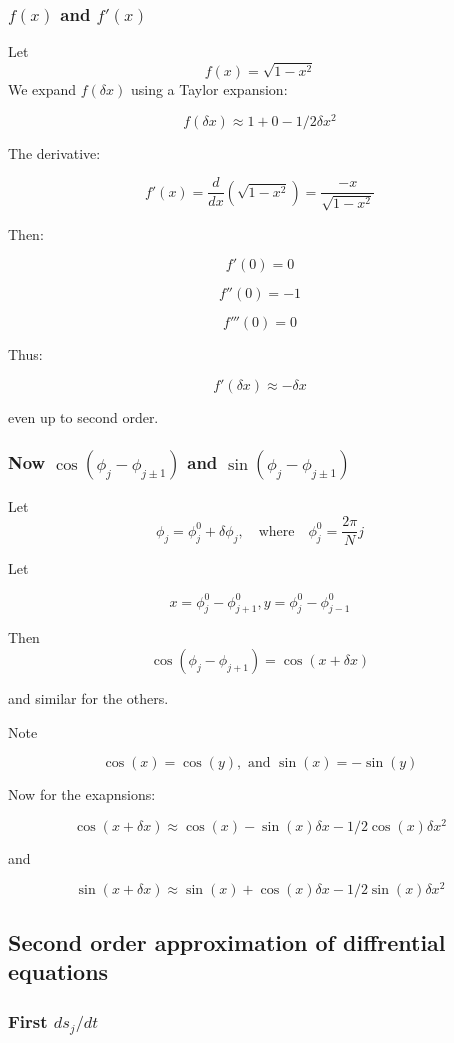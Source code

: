 \documentclass{article}
\begin{document}
\subsubsection{$f(x)$ and $f'(x)$}
Let 
\[
f(x) = \sqrt{1 - x^2}
\]
We expand \( f(\delta x) \) using a Taylor expansion:

\[
\boxed{f(\delta x) \approx 1 + 0 - 1/2 \delta x^2}
\]

The derivative:

\[
f'(x) = \frac{d}{dx} \left( \sqrt{1 - x^2} \right) = \frac{-x}{\sqrt{1 - x^2}}
\]

Then:

\[
f'(0) = 0
\]

\[
f''(0) = -1
\]

\[
f'''(0) = 0
\]

Thus:

\[
\boxed{f'(\delta x) \approx -\delta x}
\]

even up to second order.

\subsubsection{Now $\cos(\phi_j - \phi_{j\pm1})$ and $\sin(\phi_j - \phi_{j\pm1})$}

Let
\[
\phi_j = \phi_j^0 + \delta \phi_j, \quad \text{where} \quad \phi_j^0 = \frac{2\pi}{N} j
\]

Let 

\[
x = \phi_j^0 - \phi_{j+1}^0, y = \phi_j^0 - \phi_{j-1}^0
\]

Then 
\[
    \cos(\phi_j - \phi_{j+1}) = \cos(x + \delta x)
\]

and similar for the others.

Note

\[
\cos(x) = \cos(y), \text{ and } \sin(x) = -\sin(y)
\]

Now for the exapnsions:

\[
    \boxed{\cos(x + \delta x) \approx \cos(x) - \sin(x)\delta x - 1/2\cos(x)\delta x^2}
\]

and 

\[
    \boxed{\sin(x + \delta x) \approx \sin(x) + \cos(x)\delta x - 1/2\sin(x)\delta x^2}
\]

\subsection{Second order approximation of diffrential equations}

\subsubsection{First $ds_j/dt$}
\end{document}
